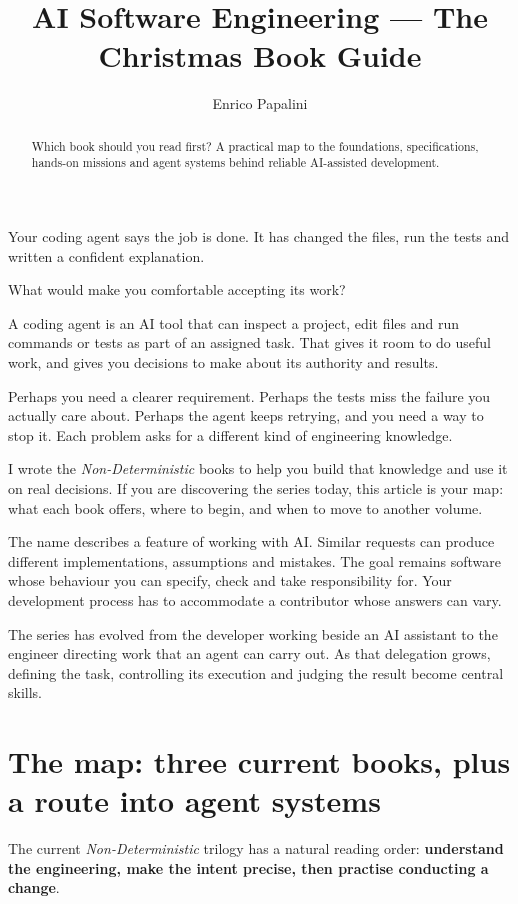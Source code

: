 \documentclass[11pt]{article}
\title{AI Software Engineering --- The Christmas Book Guide}
\author{Enrico Papalini}
\date{}
\begin{document}
\maketitle
\begin{abstract}
Which book should you read first? A practical map to the foundations, specifications, hands-on missions and agent systems behind reliable AI-assisted development.
\end{abstract}

Your coding agent says the job is done. It has changed the files, run the tests and written a confident explanation.

What would make you comfortable accepting its work?

A coding agent is an AI tool that can inspect a project, edit files and run commands or tests as part of an assigned task. That gives it room to do useful work, and gives you decisions to make about its authority and results.

Perhaps you need a clearer requirement. Perhaps the tests miss the failure you actually care about. Perhaps the agent keeps retrying, and you need a way to stop it. Each problem asks for a different kind of engineering knowledge.

I wrote the \emph{Non-Deterministic} books to help you build that knowledge and use it on real decisions. If you are discovering the series today, this article is your map: what each book offers, where to begin, and when to move to another volume.

The name describes a feature of working with AI. Similar requests can produce different implementations, assumptions and mistakes. The goal remains software whose behaviour you can specify, check and take responsibility for. Your development process has to accommodate a contributor whose answers can vary.

The series has evolved from the developer working beside an AI assistant to the engineer directing work that an agent can carry out. As that delegation grows, defining the task, controlling its execution and judging the result become central skills.

\section{The map: three current books, plus a route into agent systems}

The current \emph{Non-Deterministic} trilogy has a natural reading order: \textbf{understand the engineering, make the intent precise, then practise conducting a change}.
\end{document}
